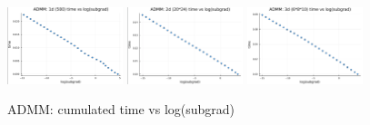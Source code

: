 \documentclass{article}
\begin{document}
\begin{figure}[H]
{\begin{minipage}[b]{1\textwidth}
   		 	\includegraphics[width=0.3\textwidth]{Interior Point Method/subgradplot3_fig/ADMM1dtimevsloggrad.png}		 	\includegraphics[width=0.3\textwidth]{Interior Point Method/subgradplot3_fig/ADMM2dtimevsloggrad.png}           \includegraphics[width=0.3\textwidth]{Interior Point Method/subgradplot3_fig/ADMM3dtimevsloggrad.png}
    		\end{minipage}
      \caption{ADMM: cumulated time vs log(subgrad)}
		}
\end{figure}
\end{document}
